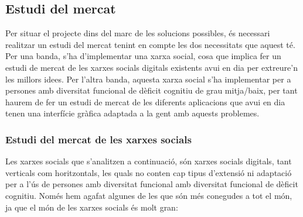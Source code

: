\documentclass[11pt,catalan,listoffigures,listoftables]{tfgetsinf}
\begin{document}
\subsection{Estudi del mercat}

Per situar el projecte dins del marc de les solucions possibles, és necessari realitzar un estudi del mercat tenint en compte les dos necessitats que aquest té. Per una banda, s’ha d’implementar una xarxa social, cosa que implica fer un estudi de mercat de les xarxes socials digitals existents avui en dia per extreure’n les millors idees. Per l’altra banda, aquesta xarxa social s’ha implementar per a persones amb diversitat funcional de dèficit cognitiu de grau mitja/baix, per tant haurem de fer un estudi de mercat de les diferents aplicacions que avui en dia tenen una interfície gràfica adaptada a la gent amb aquests problemes.

\subsubsection{Estudi del mercat de les xarxes socials}

Les xarxes socials que s’analitzen a continuació, són xarxes socials digitals, tant verticals com horitzontals, les quals no conten cap tipus d’extensió ni adaptació per a l’ús de persones amb diversitat funcional amb diversitat funcional de dèficit cognitiu. Només hem agafat algunes de les que són més conegudes a tot el món, ja que el món de les xarxes socials és molt gran:
\end{document}
